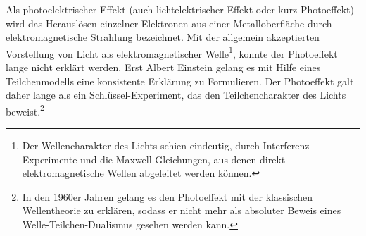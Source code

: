 Als photoelektrischer Effekt (auch lichtelektrischer Effekt oder kurz Photoeffekt) wird das Herauslösen einzelner Elektronen aus einer Metalloberfläche durch elektromagnetische Strahlung bezeichnet. Mit der allgemein akzeptierten Vorstellung von Licht als elektromagnetischer Welle\footnote{Der Wellencharakter des Lichts schien eindeutig, durch Interferenz-Experimente und die Maxwell-Gleichungen, aus denen direkt elektromagnetische Wellen abgeleitet werden können.}, konnte der Photoeffekt lange nicht erklärt werden. Erst Albert Einstein gelang es mit Hilfe eines Teilchenmodells eine konsistente Erklärung zu Formulieren. Der Photoeffekt galt daher lange als ein Schlüssel-Experiment, das den Teilchencharakter des Lichts beweist.\footnote{In den 1960er Jahren gelang es den Photoeffekt mit der klassischen Wellentheorie zu erklären, sodass er nicht mehr als absoluter Beweis eines Welle-Teilchen-Dualismus gesehen werden kann.}